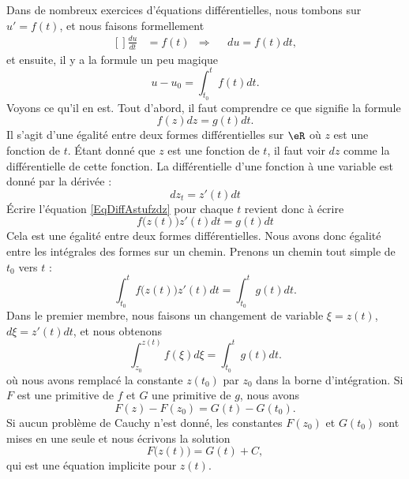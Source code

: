 Dans de nombreux exercices d'équations différentielles, nous tombons sur $u'=f(t)$, et nous faisons formellement
\begin{equation}
    \begin{aligned}[]
        \frac{ du }{ dt }&=f(t) &\Rightarrow    &&du=f(t)dt,
    \end{aligned}
\end{equation}
et ensuite, il y a la formule un peu magique
\begin{equation}
    u-u_0=\int_{t_0}^tf(t)dt.
\end{equation}
Voyons ce qu'il en est. Tout d'abord, il faut comprendre ce que signifie la formule
\begin{equation}        \label{EqDiffAstufzdz}
    f(z)dz=g(t)dt.
\end{equation}
Il s'agit d'une égalité entre deux formes différentielles sur $\eR$ où $z$ est une fonction de $t$.  Étant donné que $z$ est une fonction de $t$, il faut voir $dz$ comme la différentielle de cette fonction. La différentielle d'une fonction à une variable est donné par la dérivée :
\begin{equation}
    dz_t=z'(t)dt
\end{equation}
Écrire l'équation \eqref{EqDiffAstufzdz} pour chaque $t$ revient donc à écrire
\begin{equation}
    f\big( z(t) \big)z'(t)dt=g(t)dt
\end{equation}
Cela est une égalité entre deux formes différentielles. Nous avons donc égalité entre les intégrales des formes sur un chemin. Prenons un chemin tout simple de $t_0$ vers $t$ :
\begin{equation}
    \int_{t_0}^tf\big( z(t) \big)z'(t)dt=\int_{t_0}^tg(t)dt.
\end{equation}
Dans le premier membre, nous faisons un changement de variable $\xi=z(t)$, $d\xi=z'(t)dt$, et nous obtenons
\begin{equation}        \label{EqIntDiffAstuztz}
    \int_{z_0}^{z(t)}f(\xi)d\xi=\int_{t_0}^tg(t)dt.
\end{equation}
où nous avons remplacé la constante $z(t_0)$ par $z_0$ dans la borne d'intégration.  Si $F$ est une primitive de $f$ et $G$ une primitive de $g$, nous avons
\begin{equation}
    F(z)-F(z_0)=G(t)-G(t_0).
\end{equation}
Si aucun problème de Cauchy n'est donné, les constantes $F(z_0)$ et $G(t_0)$ sont mises en une seule et nous écrivons la solution
\begin{equation}
    F\big( z(t) \big)=G(t)+C,
\end{equation}
qui est une équation implicite pour $z(t)$. 

